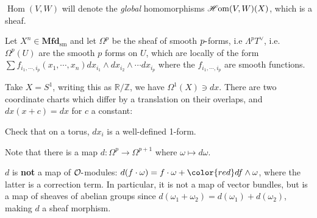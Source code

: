 \begin{warnings}

\({\operatorname{Hom}}(V, W)\) will denote the \emph{global}
homomorphisms \(\mathscr{H}\kern-2pt\operatorname{om}(V, W)(X)\), which
is a sheaf.

\end{warnings}

\begin{example}[?]

Let \(X^n \in {\mathbf{Mfd}}_{{\operatorname{sm}}}\) and let
\(\Omega^p\) be the sheaf of smooth \(p{\hbox{-}}\)forms, i.e
\(\Lambda^p T^\vee\), i.e.~\(\Omega^p(U)\) are the smooth \(p\) forms on
\(U\), which are locally of the form
\(\sum f_{i_1, \cdots, i_p} (x_1, \cdots, x_n) dx_{i_1} \wedge dx_{i_2} \wedge \cdots dx_{i_p}\)
where the \(f_{i_1, \cdots, i_p}\) are smooth functions.

\begin{example}

Take \(X= S^1\), writing this as \({\mathbb{R}}/{\mathbb{Z}}\), we have
\(\Omega^1(X) \ni dx\). There are two coordinate charts which differ by
a translation on their overlaps, and \(dx(x + c) =dx\) for \(c\) a
constant:

\begin{figure}
\centering
{}
\end{figure}

\end{example}

\begin{exercise}[?]

Check that on a torus, \(dx_i\) is a well-defined 1-form.

\end{exercise}

\end{example}

\begin{remark}

Note that there is a map \(d: \Omega^p \to \Omega^{p+1}\) where
\(\omega\mapsto d \omega\).

\end{remark}

\begin{warnings}

\(d\) is \textbf{not} a map of \({\mathcal{O}}{\hbox{-}}\)modules:
\(d(f\cdot \omega) = f\cdot \omega + {\color{red} df \wedge \omega}\),
where the latter is a correction term. In particular, it is not a map of
vector bundles, but is a map of sheaves of abelian groups since
\(d ( \omega_1 + \omega_2) = d( \omega_1 ) + d ( \omega_2)\), making
\(d\) a sheaf morphism.

\end{warnings}

